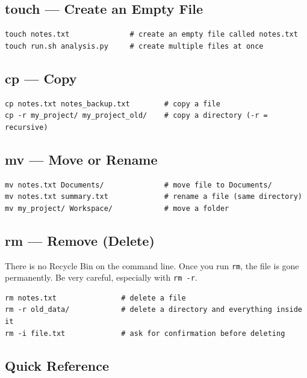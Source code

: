 \documentclass[12pt,a4paper]{article}
\newcommand{\warn}[1]{%
  \begin{tcolorbox}[warnstyle]
    #1
  \end{tcolorbox}
}
\newcommand{\cmd}[1]{\texttt{\textcolor{kugreen!70!black}{#1}}}
\begin{document}
\subsection{touch --- Create an Empty File}

\begin{lstlisting}[style=bash]
touch notes.txt              # create an empty file called notes.txt
touch run.sh analysis.py     # create multiple files at once
\end{lstlisting}

\subsection{cp --- Copy}

\begin{lstlisting}[style=bash]
cp notes.txt notes_backup.txt        # copy a file
cp -r my_project/ my_project_old/    # copy a directory (-r = recursive)
\end{lstlisting}

\subsection{mv --- Move or Rename}

\begin{lstlisting}[style=bash]
mv notes.txt Documents/              # move file to Documents/
mv notes.txt summary.txt             # rename a file (same directory)
mv my_project/ Workspace/            # move a folder
\end{lstlisting}

\subsection{rm --- Remove (Delete)}

\warn{
  There is no Recycle Bin on the command line. Once you run \cmd{rm}, the
  file is gone permanently. Be very careful, especially with \cmd{rm -r}.
}

\begin{lstlisting}[style=bash]
rm notes.txt               # delete a file
rm -r old_data/            # delete a directory and everything inside it
rm -i file.txt             # ask for confirmation before deleting
\end{lstlisting}

\subsection{Quick Reference}
\end{document}
